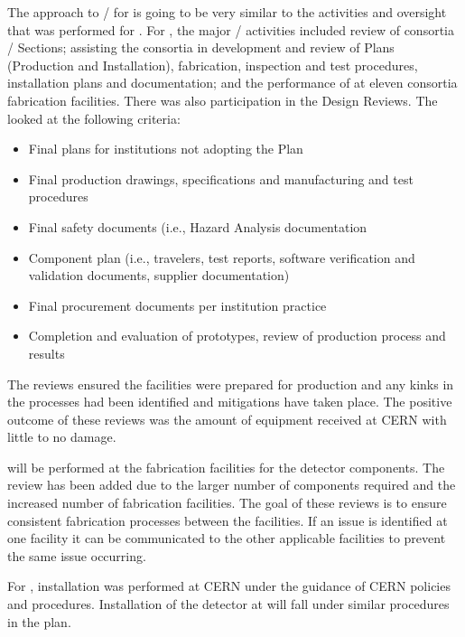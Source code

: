 The approach to / for  is going to be
very similar to the activities and oversight that was performed for
.  For , the major
/ activities included review of consortia
 / Sections; assisting the consortia in
development and review of  Plans (Production and
Installation), fabrication, inspection and test procedures,
installation plans and documentation; and the performance of
 at eleven consortia fabrication facilities.  There was
also  participation in the  Design Reviews.
The  looked at the following criteria:
\begin{itemize}
  \item Final  plans for institutions not adopting the
      Plan
  \item Final production drawings, specifications and manufacturing
    and test procedures
  \item Final safety documents (i.e., Hazard Analysis documentation
  \item Component  plan (i.e., travelers, test reports,
    software verification and validation documents, supplier
    documentation)
  \item Final procurement documents per institution practice
  \item Completion and evaluation of prototypes, review of production
    process and  results
\end{itemize}
The reviews ensured the facilities
were prepared for production and any kinks in the processes had been
identified and mitigations have taken place. The positive outcome of
these reviews was the amount of equipment received at CERN with little
to no damage.

 will be performed at the fabrication facilities for the
 detector components. The review has been added due to the
larger number of components required and the increased number of
fabrication facilities. The goal of these reviews is to ensure
consistent fabrication processes between the facilities. If an issue
is identified at one facility it can be communicated to the other
applicable facilities to prevent the same issue occurring.

For , installation was performed at CERN under the
guidance of CERN policies and procedures. Installation of the
 detector at  will fall under similar procedures in the
  plan.
